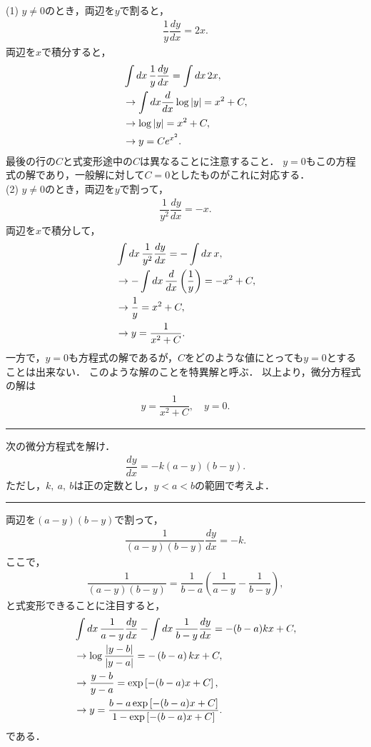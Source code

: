 \noindent
(1) $y\neq 0$のとき，両辺を$y$で割ると，
\begin{align}
  \dfrac{1}{y}\dfrac{dy}{dx} = 2x. 
\end{align} 
両辺を$x$で積分すると，
\begin{align}
  & \int dx\, \dfrac{1}{y}\dfrac{dy}{dx} = \int dx\,2x, \notag \\
  & \rightarrow \int dx \dfrac{d}{dx} \log \left|y\right| = x^2 + C, \notag \\
  & \rightarrow \log \left|y\right| = x^2 + C, \notag \\
  & \rightarrow y = Ce^{x^2}. 
\end{align}
最後の行の$C$と式変形途中の$C$は異なることに注意すること．
$y=0$もこの方程式の解であり，一般解に対して$C=0$としたものがこれに対応する．\\
(2) $y\neq 0$のとき，両辺を$y$で割って，
\begin{align}
  \dfrac{1}{y^2}\dfrac{dy}{dx} = - x. 
\end{align}
両辺を$x$で積分して，
\begin{align}
  & \int dx\, \dfrac{1}{y^2}\dfrac{dy}{dx} = -\int dx\,x, \notag \\
  & \rightarrow -\int dx\, \dfrac{d}{dx}\left(\dfrac{1}{y}\right) = -x^2 + C, \notag \\
  & \rightarrow \dfrac{1}{y} = x^2 +C, \notag \\
  & \rightarrow y = \dfrac{1}{x^2 + C}. 
\end{align}
一方で，$y=0$も方程式の解であるが，$C$をどのような値にとっても$y=0$とすることは出来ない．
このような解のことを特異解と呼ぶ．
以上より，微分方程式の解は
\begin{align}
  y = \dfrac{1}{x^2 + C}, \quad y = 0. 
\end{align}

\newpage
%
\hrule
\reidai
次の微分方程式を解け．
\begin{align}
 \dfrac{dy}{dx} = -k \left(a-y\right)\left(b-y\right). 
\end{align}
ただし，$k,~a,~b$は正の定数とし，$y<a<b$の範囲で考えよ．
\vspace*{.2cm}
\hrule
\vspace*{.2cm}
両辺を$(a-y)(b-y)$で割って，
\begin{align}
 \dfrac{1}{(a-y)(b-y)}\dfrac{dy}{dx} = -k. 
\end{align}
ここで，
\begin{align}
 \dfrac{1}{(a-y)(b-y)} = \dfrac{1}{b-a}\left(\dfrac{1}{a-y} - \dfrac{1}{b-y}\right),
\end{align}
と式変形できることに注目すると，
\begin{align}
 & \int dx\,\dfrac{1}{a-y}\dfrac{dy}{dx} - \int dx\, \dfrac{1}{b-y}\dfrac{dy}{dx}
 =  - (b-a)k x + C, \notag \\
 & \rightarrow \log \dfrac{\left|y-b\right|}{\left|y-a\right|} = -\left(b-a\right)kx + C,
 \notag \\
 & \rightarrow \dfrac{y-b}{y-a} = \exp\left[-(b-a)x + C \right], \notag \\
 & \rightarrow y = \dfrac{b-a\exp\left[-(b-a)x + C\right]}{1-\exp\left[-(b-a)x + C\right]}.
\end{align}
である．\\

